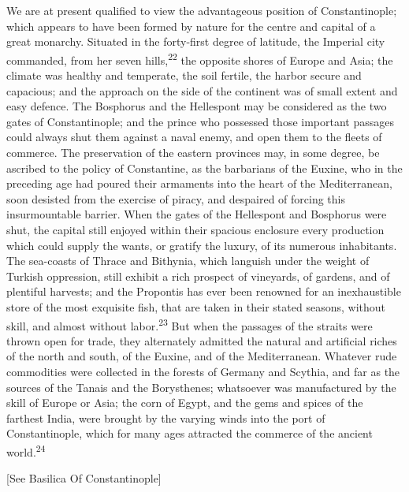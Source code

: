 We are at present qualified to view the advantageous position of
Constantinople; which appears to have been formed by nature for
the centre and capital of a great monarchy. Situated in the
forty-first degree of latitude, the Imperial city commanded, from
her seven hills,\textsuperscript{22} the opposite shores of Europe and Asia; the
climate was healthy and temperate, the soil fertile, the harbor
secure and capacious; and the approach on the side of the
continent was of small extent and easy defence. The Bosphorus and
the Hellespont may be considered as the two gates of
Constantinople; and the prince who possessed those important
passages could always shut them against a naval enemy, and open
them to the fleets of commerce. The preservation of the eastern
provinces may, in some degree, be ascribed to the policy of
Constantine, as the barbarians of the Euxine, who in the
preceding age had poured their armaments into the heart of the
Mediterranean, soon desisted from the exercise of piracy, and
despaired of forcing this insurmountable barrier. When the gates
of the Hellespont and Bosphorus were shut, the capital still
enjoyed within their spacious enclosure every production which
could supply the wants, or gratify the luxury, of its numerous
inhabitants. The sea-coasts of Thrace and Bithynia, which
languish under the weight of Turkish oppression, still exhibit a
rich prospect of vineyards, of gardens, and of plentiful
harvests; and the Propontis has ever been renowned for an
inexhaustible store of the most exquisite fish, that are taken in
their stated seasons, without skill, and almost without labor.\textsuperscript{23}
But when the passages of the straits were thrown open for trade,
they alternately admitted the natural and artificial riches of
the north and south, of the Euxine, and of the Mediterranean.
Whatever rude commodities were collected in the forests of
Germany and Scythia, and far as the sources of the Tanais and the
Borysthenes; whatsoever was manufactured by the skill of Europe
or Asia; the corn of Egypt, and the gems and spices of the
farthest India, were brought by the varying winds into the port
of Constantinople, which for many ages attracted the commerce of
the ancient world.\textsuperscript{24}

[See Basilica Of Constantinople]



